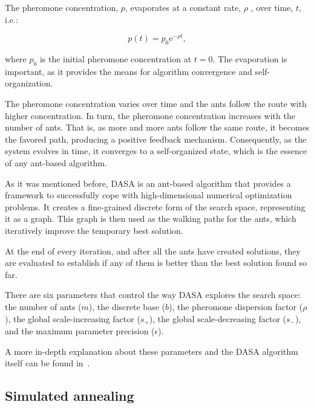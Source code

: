 The pheromone concentration, $p$, evaporates at a constant rate,
$\rho$ , over time, $t$, i.e.:

\begin{equation}
p(t)=p_{0}\mathrm{e}^{-\rho t},\label{eq:02-ACO_structure}
\end{equation}


\noindent where $p_{0}$ is the initial pheromone concentration at
$t=0$. The evaporation is important, as it provides the means for
algorithm convergence and self-organization.

The pheromone concentration varies over time and the ants follow the
route with higher concentration. In turn, the pheromone concentration
increases with the number of ants. That is, as more and more ants
follow the same route, it becomes the favored path, producing a positive
feedback mechanism. Consequently, as the system evolves in time, it
converges to a self-organized state, which is the essence of any ant-based
algorithm. 

\bigskip{}


As it was mentioned before, DASA is an ant-based algorithm that provides
a framework to successfully cope with high-dimensional numerical optimization
problems. It creates a fine-grained discrete form of the search space,
representing it as a graph. This graph is then used as the walking
paths for the ants, which iteratively improve the temporary best solution. 

At the end of every iteration, and after all the ants have created
solutions, they are evaluated to establish if any of them is better
than the best solution found so far.

There are six parameters that control the way DASA explores the search
space: the number of ants ($m$), the discrete base ($b$), the pheromone
dispersion factor ($\rho$), the global scale-increasing factor ($s_{+}$),
the global scale-decreasing factor ($s_{-}$), and the maximum parameter
precision ($\epsilon$).

A more in-depth explanation about these parameters and the DASA algorithm
itself can be found in~\cite{korosec2010_DASA}.


\subsection{Simulated annealing \label{sub:02-SA}}

